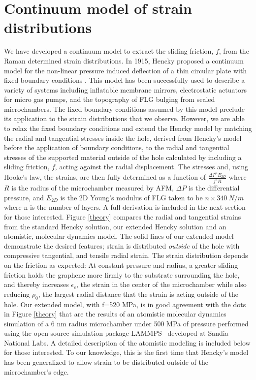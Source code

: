 \section{Continuum model of strain distributions}
We have developed a continuum model to extract the sliding friction, $f$, from the Raman determined strain distributions. In 1915, Hencky proposed a continuum model for the non-linear pressure induced deflection of a thin circular plate with fixed boundary conditions \cite{Hencky1915,Fichter1997}.  This model has been successfully used to describe a variety of systems including inflatable membrane mirrors\cite{Meinel2000}, electrostatic actuators for micro gas pumps\cite{Zhang2011b}, and the topography of FLG bulging from sealed microchambers\cite{Koenig2011}.  The fixed boundary conditions assumed by this model preclude its application to the strain distributions that we observe.  However, we are able to relax the fixed boundary conditions and extend the Hencky model by matching the radial and tangential stresses inside the hole, derived from Hencky's model before the application of boundary conditions, to the radial and tangential stresses of the supported material outside of the hole calculated by including a sliding friction, $f$, acting against the radial displacement.  The stresses and, using Hooke's law, the strains, are then fully determined as a function of $\frac{\Delta P^2 E_{2D}}{f^3 R}$ where $R$ is the radius of the microchamber measured by AFM, $\Delta P$ is the differential pressure, and $E_{2D}$ is the 2D Young's modulus of FLG taken to be $n \times 340 \ N/m$ where n is the number of layers\cite{Lee2008,Koenig2011}.  A full derivation is included in the next section for those interested. Figure \ref{theory} compares the radial and tangential strains from the standard Hencky solution, our extended Hencky solution and an atomistic, molecular dynamics model.  The solid lines of our extended model demonstrate the desired features; strain is distributed \emph{outside} of the hole with compressive tangential, and tensile radial strain. The strain distribution depends on the friction as expected: At constant pressure and radius, a greater sliding friction holds the graphene more firmly to the substrate surrounding the hole, and thereby increases $\epsilon_c$, the strain in the center of the microchamber while also reducing $\rho_0$, the largest radial distance that the strain is acting outside of the hole.  Our extended model, with f=520 MPa, is in good agreement with the dots in Figure \ref{theory} that are the results of an atomistic molecular dynamics simulation of a 6 nm radius microchamber under 500 MPa of pressure performed using the open source simulation package LAMMPS~\cite{plimptonLAMMPS,PlimptonJCP1995} developed at Sandia National Labs.  A detailed description of the atomistic modeling is included below for those interested. To our knowledge, this is the first time that Hencky's model has been generalized to allow strain to be distributed outside of the microchamber's edge.

